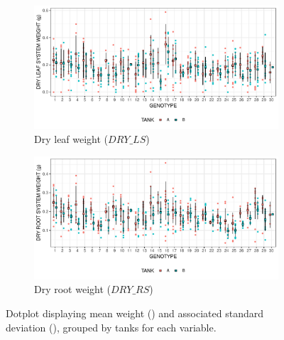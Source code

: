 \begin{figure}
\centering
	\begin{subfigure}[t]{\textwidth}
		\centering
		\includegraphics[width = \textwidth]{../../Figures/DRY_LS_summary_plot.pdf}
		\caption{Dry leaf weight ($DRY\_LS$)}
	\end{subfigure}

	\begin{subfigure}[t]{\textwidth}
		\centering
		\includegraphics[width = \textwidth]{../../Figures/DRY_RS_summary_plot.pdf}
		\caption{Dry root weight ($DRY\_RS$)}
	\end{subfigure}
	\caption[Dotplot of the mean weight and associated standard deviation]{Dotplot displaying mean weight (\protect\emptysquare) and associated standard deviation (\protect\blackline), grouped by tanks for each variable.}
\end{figure}
